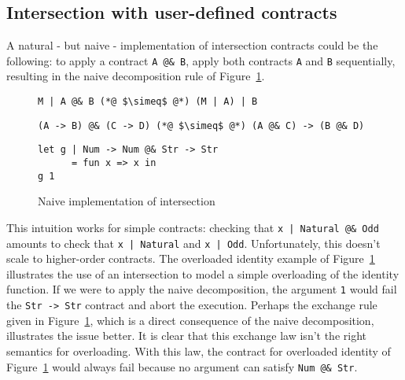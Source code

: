 \documentclass[sigplan,10pt,review,anonymous]{acmart}
\newcommand{\nickel}[1]{\lstinline[language=nickel]{#1}}
\begin{document}
\subsection{Intersection with user-defined contracts}
\label{sec:flat-and-inter}

A natural - but naive - implementation of intersection contracts could be the
following: to apply a contract \nickel{A @& B}, apply both contracts \nickel{A}
and \nickel{B} sequentially, resulting in the naive decomposition rule of
Figure~\ref{fig:naive-impl}.

\begin{figure}[h]
\begin{lstlisting}[language=nickel,frame=none,numbers=none,title={Naive
decomposition}]
M | A @& B (*@ $\simeq$ @*) (M | A) | B
\end{lstlisting}
\begin{lstlisting}[language=nickel,frame=none,numbers=none,title={Exchange law}]
(A -> B) @& (C -> D) (*@ $\simeq$ @*) (A @& C) -> (B @& D)
\end{lstlisting}
\begin{lstlisting}[language=nickel,title={Overloaded identity}]
let g | Num -> Num @& Str -> Str
      = fun x => x in
g 1
\end{lstlisting}
\caption{Naive implementation of intersection}
\label{fig:naive-impl}
\end{figure}

This intuition works for simple contracts: checking that \nickel{x | Natural @&
Odd} amounts to check that \nickel{x | Natural} and \nickel{x | Odd}.
Unfortunately, this doesn't scale to higher-order contracts.  The overloaded
identity example of Figure~\ref{fig:naive-impl} illustrates the use of an
intersection to model a simple overloading of the identity function. If we were
to apply the naive decomposition, the argument \nickel{1} would fail the
\nickel{Str -> Str} contract and abort the execution. Perhaps the exchange rule
given in Figure~\ref{fig:naive-impl}, which is a direct consequence of the naive
decomposition, illustrates the issue better. It is clear that this exchange law
isn't the right semantics for overloading. With this law, the contract for
overloaded identity of Figure~\ref{fig:naive-impl} would always fail because
no argument can satisfy \nickel{Num @& Str}.

\end{document}
